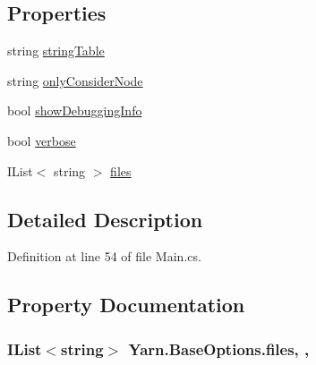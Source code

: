 \subsection*{Properties}
\begin{DoxyCompactItemize}
\item 
string \hyperlink{a00099_a7e43c3b73722956cb0f5d507e4eef527}{string\-Table}
\item 
string \hyperlink{a00099_af4c0062a1d46281d377f87084fde374e}{only\-Consider\-Node}
\item 
bool \hyperlink{a00040_a89964ea17bd19caf00cb5bff563ed01c}{show\-Debugging\-Info}
\item 
bool \hyperlink{a00040_ada4d83d1756918f362d55f6649b82b17}{verbose}
\item 
I\-List$<$ string $>$ \hyperlink{a00040_aa93cbb1bc1d5328e0a417012621e92d2}{files}
\end{DoxyCompactItemize}


\subsection{Detailed Description}


Definition at line 54 of file Main.\-cs.



\subsection{Property Documentation}
\hypertarget{a00040_aa93cbb1bc1d5328e0a417012621e92d2}{
\subsubsection[{files}]{\setlength{\rightskip}{0pt plus 5cm}I\-List$<$string$>$ Yarn.\-Base\-Options.\-files\hspace{0.3cm}{\ttfamily [get]}, {\ttfamily [set]}, {\ttfamily [inherited]}}}\label{a00040_aa93cbb1bc1d5328e0a417012621e92d2}


